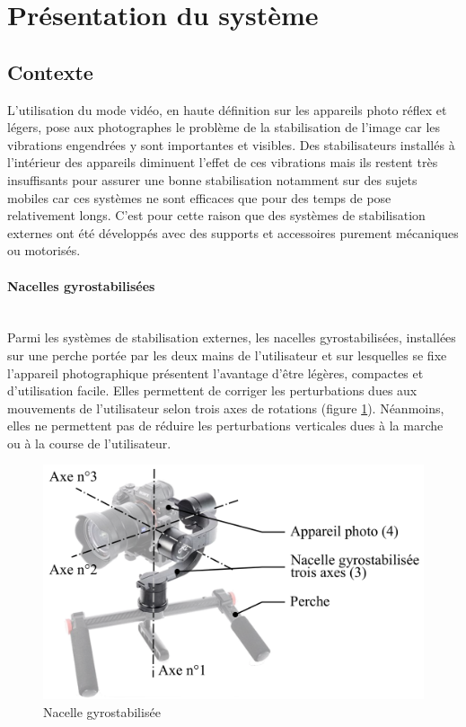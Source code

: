 

\section{Présentation du système}

\subsection{Contexte}

L'utilisation du mode vidéo, en haute définition sur les appareils photo réflex et légers, pose aux photographes le problème de la stabilisation de l'image car les vibrations engendrées y sont importantes et visibles. Des stabilisateurs installés à l'intérieur des appareils diminuent l'effet de ces vibrations mais ils restent très insuffisants
pour assurer une bonne stabilisation notamment sur des sujets mobiles car ces systèmes ne sont efficaces que pour des temps de pose relativement longs. C'est pour cette raison que des systèmes de stabilisation externes ont été développés avec des supports et accessoires purement mécaniques ou motorisés.

\paragraph{Nacelles gyrostabilisées} ~\ \\ Parmi les systèmes de stabilisation externes, les nacelles gyrostabilisées, installées sur une perche portée par les deux mains de l'utilisateur et sur lesquelles se fixe l'appareil photographique présentent l'avantage d'être légères, compactes et d'utilisation facile. Elles permettent de corriger les perturbations dues aux mouvements de l'utilisateur selon trois axes de rotations (figure \ref{fig01}). Néanmoins, elles ne permettent pas de réduire les perturbations verticales dues à la marche ou à la course de l'utilisateur.

\begin{figure}[ht!]
\begin{center}
 \includegraphics[width=0.7\linewidth]{img/fig01}
\end{center}
\caption{Nacelle gyrostabilisée}
\label{fig01}
\end{figure}

